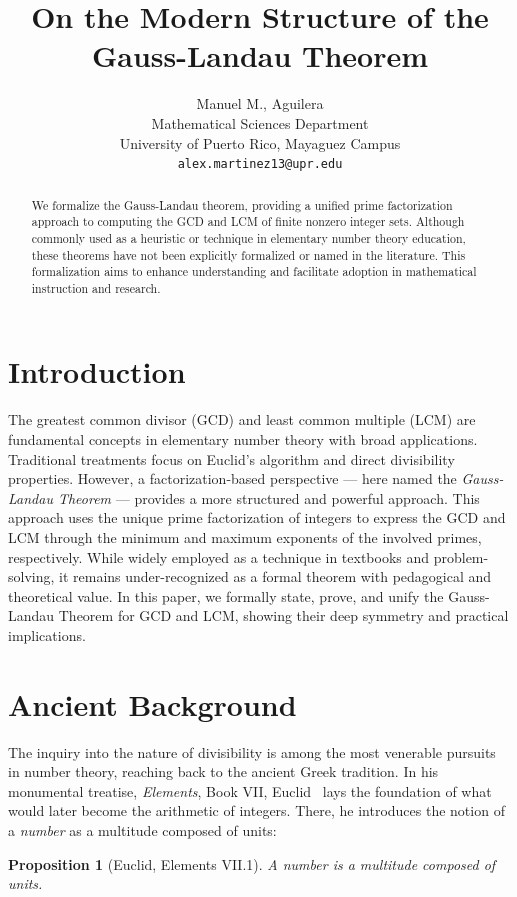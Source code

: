 \documentclass[11pt]{article}
\title{On the Modern Structure of the Gauss-Landau Theorem}
\author{Manuel M., Aguilera \\
\small Mathematical Sciences Department \\
\small University of Puerto Rico, Mayaguez Campus \\
\small \texttt{alex.martinez13@upr.edu}}
\date{}
\theoremstyle{plain}
\newtheorem{proposition}[theorem]{Proposition}
\begin{document}
\maketitle

\begin{abstract}
We formalize the Gauss-Landau theorem, providing a unified prime factorization approach to computing the GCD and LCM of finite nonzero integer sets. Although commonly used as a heuristic or technique in elementary number theory education, these theorems have not been explicitly formalized or named in the literature. This formalization aims to enhance understanding and facilitate adoption in mathematical instruction and research.
\end{abstract}
\section{Introduction}
The greatest common divisor (GCD) and least common multiple (LCM) are fundamental concepts in elementary number theory with broad applications. Traditional treatments focus on Euclid's algorithm and direct divisibility properties. However, a factorization-based perspective — here named the \emph{Gauss-Landau Theorem} — provides a more structured and powerful approach. This approach uses the unique prime factorization of integers to express the GCD and LCM through the minimum and maximum exponents of the involved primes, respectively. While widely employed as a technique in textbooks and problem-solving, it remains under-recognized as a formal theorem with pedagogical and theoretical value. In this paper, we formally state, prove, and unify the Gauss-Landau Theorem for GCD and LCM, showing their deep symmetry and practical implications.

\section{Ancient Background}
The inquiry into the nature of divisibility is among the most venerable pursuits in number theory, reaching back to the ancient Greek tradition. In his monumental treatise, \emph{Elements}, Book VII, Euclid~\cite{Euclid} lays the foundation of what would later become the arithmetic of integers. There, he introduces the notion of a \emph{number} as a multitude composed of units:

\begin{proposition}[Euclid, Elements VII.1]
A number is a multitude composed of units.
\end{proposition}
\end{document}
